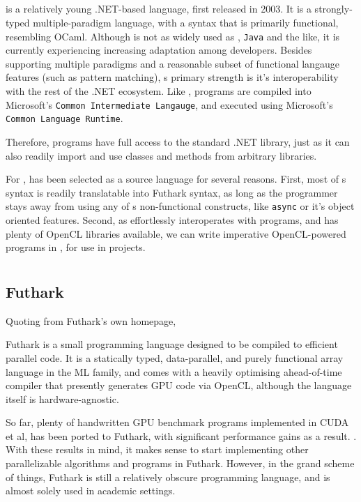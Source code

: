 \subsection*{\fsharp{}}
\fsharp{} is a relatively young .NET-based language, first released in 2003.
It is a strongly-typed multiple-paradigm language, with a syntax that is
primarily functional, resembling OCaml.
Although \fsharp{} is not as widely used as \csharp{}, \texttt{Java} and the
like, it is currently experiencing increasing adaptation among
developers\cite{citeme}.
Besides supporting multiple paradigms and a reasonable subset of functional
langauge features (such as pattern matching), \fsharp{}s primary strength is
it's interoperability with the rest of the .NET ecosystem. Like \csharp{},
\fsharp{} programs are compiled into Microsoft's \texttt{Common Intermediate
  Langauge}, and executed using Microsoft's \texttt{Common Language Runtime}.

Therefore, \fsharp{} programs have full access to the standard .NET library,
just as it can also readily import and use classes and methods from arbitrary
\csharp{} libraries.

For \fshark{}, \fsharp{} has been selected as a source language for several
reasons.
First, most of \fsharp{}s syntax is readily translatable into Futhark syntax, as
long as the programmer stays away from using any of \fsharp{}s non-functional
constructs, like \texttt{async} or it's object oriented features.
Second, as \fsharp{} effortlessly interoperates with \csharp{} programs, and
\csharp{} has plenty of OpenCL libraries available, we can write imperative
OpenCL-powered programs in \csharp{}, for use in \fsharp{} projects.


\section*{\csharp{}}
\csharp{} 
\csharp{} 
\csharp{} 
\csharp{} 

\clearpage
\subsection*{Futhark}
Quoting from Futhark's own homepage,
\begin{formal}
  Futhark is a small programming language designed to be compiled to efficient parallel code. It is a statically typed, data-parallel, and purely functional array language in the ML family, and comes with a heavily optimising ahead-of-time compiler that presently generates GPU code via OpenCL, although the language itself is hardware-agnostic.
\end{formal}
So far, plenty of handwritten GPU benchmark programs implemented in CUDA et al,
has been ported to Futhark, with significant performance gains as a result.
\cite{citesomething}. With these results in mind, it makes sense to start
implementing other parallelizable algorithms and programs in Futhark. However,
in the grand scheme of things, Futhark is still a relatively obscure programming
language, and is almost solely used in academic settings.

